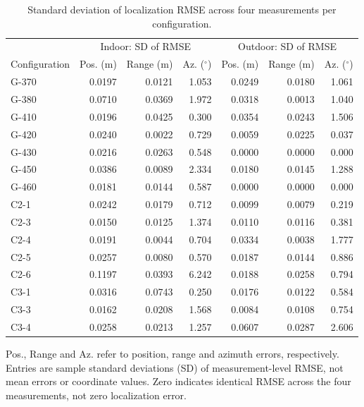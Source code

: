 \begin{table}[t]
\centering
\caption{Standard deviation of localization RMSE across four measurements per configuration.}
\label{tab:stability}
\footnotesize
\setlength{\tabcolsep}{3pt}
\begin{tabular}{lrrrrrr}
\hline
 & \multicolumn{3}{c}{Indoor: SD of RMSE} & \multicolumn{3}{c}{Outdoor: SD of RMSE} \\ Configuration & Pos. (m) & Range (m) & Az. ($^\circ$) & Pos. (m) & Range (m) & Az. ($^\circ$) \\
\hline
G-370 & 0.0197 & 0.0121 & 1.053 & 0.0249 & 0.0180 & 1.061 \\
G-380 & 0.0710 & 0.0369 & 1.972 & 0.0318 & 0.0013 & 1.040 \\
G-410 & 0.0196 & 0.0425 & 0.300 & 0.0354 & 0.0243 & 1.506 \\
G-420 & 0.0240 & 0.0022 & 0.729 & 0.0059 & 0.0225 & 0.037 \\
G-430 & 0.0216 & 0.0263 & 0.548 & 0.0000 & 0.0000 & 0.000 \\
G-450 & 0.0386 & 0.0089 & 2.334 & 0.0180 & 0.0145 & 1.288 \\
G-460 & 0.0181 & 0.0144 & 0.587 & 0.0000 & 0.0000 & 0.000 \\
C2-1 & 0.0242 & 0.0179 & 0.712 & 0.0099 & 0.0079 & 0.219 \\
C2-3 & 0.0150 & 0.0125 & 1.374 & 0.0110 & 0.0116 & 0.381 \\
C2-4 & 0.0191 & 0.0044 & 0.704 & 0.0334 & 0.0038 & 1.777 \\
C2-5 & 0.0257 & 0.0080 & 0.570 & 0.0187 & 0.0144 & 0.886 \\
C2-6 & 0.1197 & 0.0393 & 6.242 & 0.0188 & 0.0258 & 0.794 \\
C3-1 & 0.0316 & 0.0743 & 0.250 & 0.0176 & 0.0122 & 0.584 \\
C3-3 & 0.0162 & 0.0208 & 1.568 & 0.0084 & 0.0108 & 0.754 \\
C3-4 & 0.0258 & 0.0213 & 1.257 & 0.0607 & 0.0287 & 2.606 \\
\hline
\end{tabular}
\par\smallskip\parbox{0.98\linewidth}{\scriptsize Pos., Range and Az. refer to position, range and azimuth errors, respectively. Entries are sample standard deviations (SD) of measurement-level RMSE, not mean errors or coordinate values. Zero indicates identical RMSE across the four measurements, not zero localization error.}
\end{table}
